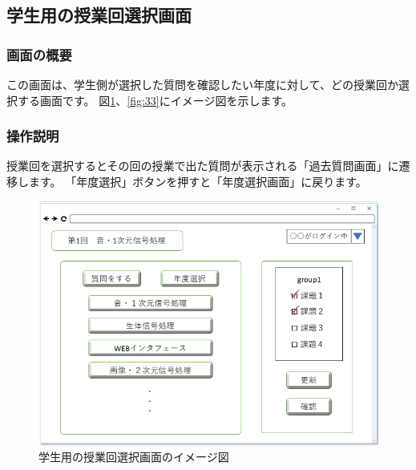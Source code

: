\subsection{学生用の授業回選択画面}
\subsubsection{画面の概要}
この画面は、学生側が選択した質問を確認したい年度に対して、どの授業回か選択する画面です。
図\ref{fig:32}、\ref{fig:33}にイメージ図を示します。

\subsubsection{操作説明}
授業回を選択するとその回の授業で出た質問が表示される「過去質問画面」に遷移します。
「年度選択」ボタンを押すと「年度選択画面」に戻ります。

\begin{figure}[phtbp]
  \begin{center}
    \includegraphics[width=1\linewidth,clip]{./img/32.png}
    \caption{学生用の授業回選択画面のイメージ図}\label{fig:32}
  \end{center}
\end{figure}

